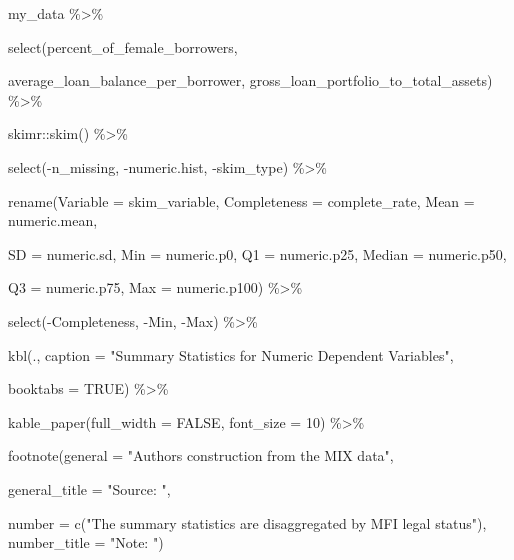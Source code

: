 \documentclass[a4paper,nobind]{templates/ociamthesis}
\newenvironment{Shaded}{\begin{snugshade}}{\end{snugshade}}
\newcommand{\AttributeTok}[1]{\textcolor[rgb]{0.77,0.63,0.00}{#1}}
\newcommand{\ConstantTok}[1]{\textcolor[rgb]{0.00,0.00,0.00}{#1}}
\newcommand{\DecValTok}[1]{\textcolor[rgb]{0.00,0.00,0.81}{#1}}
\newcommand{\FunctionTok}[1]{\textcolor[rgb]{0.00,0.00,0.00}{#1}}
\newcommand{\NormalTok}[1]{#1}
\newcommand{\SpecialCharTok}[1]{\textcolor[rgb]{0.00,0.00,0.00}{#1}}
\newcommand{\StringTok}[1]{\textcolor[rgb]{0.31,0.60,0.02}{#1}}
\renewenvironment{Shaded}
{
  \vspace{10pt}%
  \begin{snugshade}%
}{%
  \end{snugshade}%
  \vspace{8pt}%
}
\begin{document}
\begin{Shaded}
\begin{Highlighting}[]
\NormalTok{my\_data }\SpecialCharTok{\%\textgreater{}\%} 
  
  \FunctionTok{select}\NormalTok{(percent\_of\_female\_borrowers,}
                                                 
\NormalTok{  average\_loan\_balance\_per\_borrower, gross\_loan\_portfolio\_to\_total\_assets) }\SpecialCharTok{\%\textgreater{}\%} 
  
\NormalTok{  skimr}\SpecialCharTok{::}\FunctionTok{skim}\NormalTok{() }\SpecialCharTok{\%\textgreater{}\%} 
  
  \FunctionTok{select}\NormalTok{(}\SpecialCharTok{{-}}\NormalTok{n\_missing, }\SpecialCharTok{{-}}\NormalTok{numeric.hist, }\SpecialCharTok{{-}}\NormalTok{skim\_type) }\SpecialCharTok{\%\textgreater{}\%} 
  
  \FunctionTok{rename}\NormalTok{(}\AttributeTok{Variable =}\NormalTok{ skim\_variable, }\AttributeTok{Completeness =}\NormalTok{ complete\_rate, }\AttributeTok{Mean =}\NormalTok{ numeric.mean, }
         
         \AttributeTok{SD =}\NormalTok{ numeric.sd, }\AttributeTok{Min =}\NormalTok{ numeric.p0, }\AttributeTok{Q1 =}\NormalTok{ numeric.p25, }\AttributeTok{Median =}\NormalTok{ numeric.p50, }
         
         \AttributeTok{Q3 =}\NormalTok{ numeric.p75, }\AttributeTok{Max =}\NormalTok{ numeric.p100) }\SpecialCharTok{\%\textgreater{}\%} 
  
  \FunctionTok{select}\NormalTok{(}\SpecialCharTok{{-}}\NormalTok{Completeness, }\SpecialCharTok{{-}}\NormalTok{Min, }\SpecialCharTok{{-}}\NormalTok{Max) }\SpecialCharTok{\%\textgreater{}\%} 
  
  \FunctionTok{kbl}\NormalTok{(., }\AttributeTok{caption =} \StringTok{"Summary Statistics for Numeric Dependent Variables"}\NormalTok{, }
      
      \AttributeTok{booktabs =} \ConstantTok{TRUE}\NormalTok{) }\SpecialCharTok{\%\textgreater{}\%} 
  
  \FunctionTok{kable\_paper}\NormalTok{(}\AttributeTok{full\_width =} \ConstantTok{FALSE}\NormalTok{, }\AttributeTok{font\_size =} \DecValTok{10}\NormalTok{) }\SpecialCharTok{\%\textgreater{}\%} 
  
  \FunctionTok{footnote}\NormalTok{(}\AttributeTok{general =} \StringTok{"Authors\textquotesingle{} construction from the MIX data"}\NormalTok{,}
           
           \AttributeTok{general\_title =} \StringTok{"Source: "}\NormalTok{,}
           
           \AttributeTok{number =} \FunctionTok{c}\NormalTok{(}\StringTok{"The summary statistics are disaggregated by MFI legal status"}\NormalTok{),}
           \AttributeTok{number\_title =} \StringTok{"Note: "}\NormalTok{)}
\end{Highlighting}
\end{Shaded}
\end{document}
